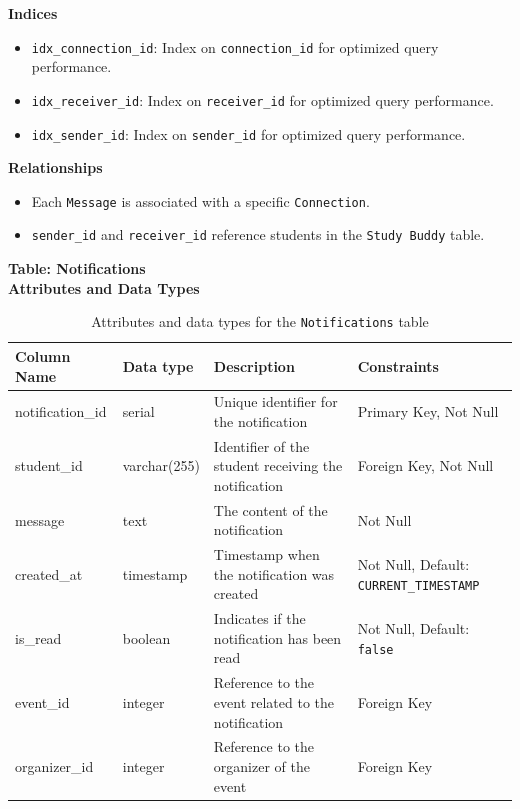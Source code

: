 \documentclass[12pt]{article}
\begin{document}
\noindent
\textbf{Indices}
\begin{itemize}
    \item \texttt{idx\_connection\_id}: Index on \texttt{connection\_id} for optimized query performance.
    \item \texttt{idx\_receiver\_id}: Index on \texttt{receiver\_id} for optimized query performance.
    \item \texttt{idx\_sender\_id}: Index on \texttt{sender\_id} for optimized query performance.
\end{itemize}

\pagebreak

\noindent
\textbf{Relationships} 
\begin{itemize}
    \item Each \texttt{Message} is associated with a specific \texttt{Connection}.
    \item \texttt{sender\_id} and \texttt{receiver\_id} reference students in the \texttt{Study Buddy} table.
\end{itemize}


\textbf{Table: Notifications} \\

\textbf{Attributes and Data Types}
\begin{table}[H]
    \centering
    \renewcommand{\arraystretch}{1.5}
    \begin{tabular}{|l|l|p{2.1cm}|l|}
    \hline
    \rowcolor[HTML]{96FFFB} 
    \textbf{Column Name} & \textbf{Data type}        & \textbf{Description}                                   & \textbf{Constraints}             \\ \hline
    notification\_id     & serial                  & Unique identifier for the notification                & Primary Key, Not Null            \\ \hline
    student\_id          & varchar(255)            & Identifier of the student receiving the notification   & Foreign Key, Not Null            \\ \hline
    message              & text                    & The content of the notification                       & Not Null                         \\ \hline
    created\_at          & timestamp               & Timestamp when the notification was created            & Not Null, Default: \texttt{CURRENT\_TIMESTAMP} \\ \hline
    is\_read             & boolean                 & Indicates if the notification has been read            & Not Null, Default: \texttt{false} \\ \hline
    event\_id            & integer                 & Reference to the event related to the notification    & Foreign Key                      \\ \hline
    organizer\_id        & integer                 & Reference to the organizer of the event               & Foreign Key                      \\ \hline
    \end{tabular}
    \caption{Attributes and data types for the \texttt{Notifications} table}
\end{table}
\end{document}
